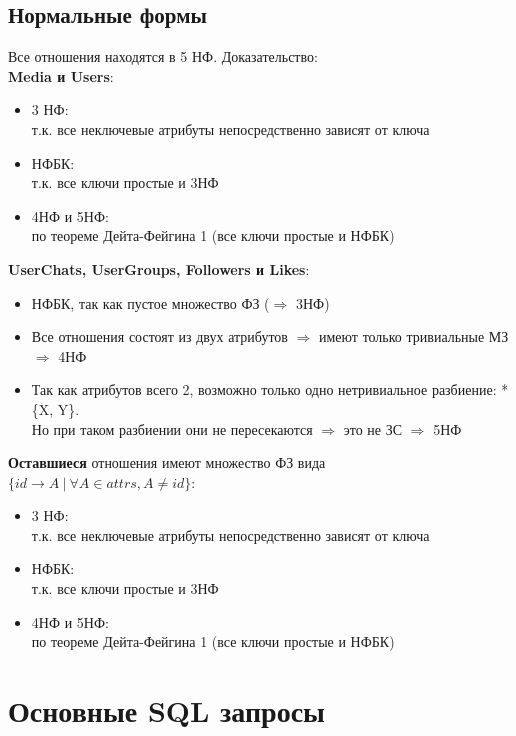 \documentclass[12pt, a4paper] {ncc}
\begin{document}
\subsection{Нормальные формы}
Все отношения находятся в 5 НФ. Доказательство:\\
\textbf{Media и Users}:
\begin{itemize}
\item 3 НФ: \\
т.к. все неключевые атрибуты непосредственно зависят от ключа
\item НФБК: \\
т.к. все ключи простые и 3НФ
\item 4НФ и 5НФ: \\
по теореме Дейта-Фейгина 1 (все ключи простые и НФБК)
\end{itemize}
\textbf{UserChats, UserGroups, Followers и Likes}:
\begin{itemize}
\item НФБК, так как пустое множество ФЗ ($\Rightarrow$ 3НФ)
\item Все отношения состоят из двух атрибутов $\Rightarrow$ имеют только тривиальные МЗ $\Rightarrow$ 4НФ
\item Так как атрибутов всего 2, возможно только одно нетривиальное разбиение: *\{X, Y\}.\\ 
Но при таком разбиении они не пересекаются $\Rightarrow$ это не ЗС $\Rightarrow$ 5НФ
\end{itemize}
\textbf{Оставшиеся} отношения имеют множество ФЗ вида \\
$\{id \rightarrow A ~ | ~ \forall A \in \textit{attrs}, A \ne id\}$:
\begin{itemize}
\item 3 НФ: \\
т.к. все неключевые атрибуты непосредственно зависят от ключа
\item НФБК: \\
т.к. все ключи простые и 3НФ
\item 4НФ и 5НФ: \\
по теореме Дейта-Фейгина 1 (все ключи простые и НФБК)
\end{itemize}
\section{Основные SQL запросы}
\end{document}
